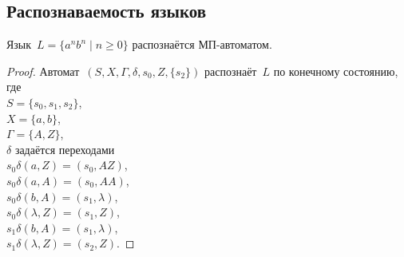 \subsection{Распознаваемость языков}
\begin{statement}
Язык~$L = \{ a^n b^n \mid n \geqslant 0 \}$ распознаётся МП-автоматом.
\end{statement}
\begin{proof}
Автомат~$(S, X, \Gamma, \delta, s_0, Z, \{ s_2 \})$ распознаёт~$L$ по конечному состоянию, где\\
$S = \{ s_0, s_1, s_2 \}$,\\
$X = \{ a, b \}$,\\
$\Gamma = \{ A, Z \}$,\\
$\delta$ задаётся переходами\\
$s_0 \delta(a, Z) = (s_0, AZ)$,\\
$s_0 \delta(a, A) = (s_0, AA)$,\\
$s_0 \delta(b, A) = (s_1, \lambda)$,\\
$s_0 \delta(\lambda, Z) = (s_1, Z)$,\\
$s_1 \delta(b, A) = (s_1, \lambda)$,\\
$s_1 \delta(\lambda, Z) = (s_2, Z)$.
\end{proof}